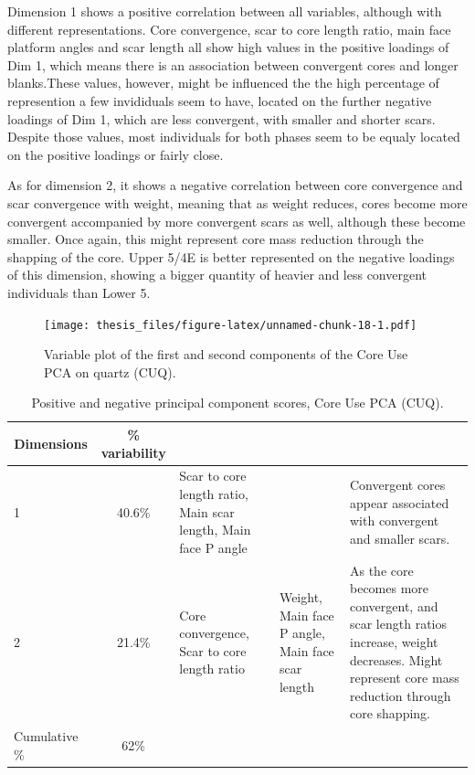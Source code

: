 \documentclass[12pt,twoside]{reedthesis}
\begin{document}
Dimension 1 shows a positive correlation between all variables, although with different representations. Core convergence, scar to core length ratio, main face platform angles and scar length all show high values in the positive loadings of Dim 1, which means there is an association between convergent cores and longer blanks.These values, however, might be influenced the the high percentage of represention a few invididuals seem to have, located on the further negative loadings of Dim 1, which are less convergent, with smaller and shorter scars. Despite those values, most individuals for both phases seem to be equaly located on the positive loadings or fairly close.

As for dimension 2, it shows a negative correlation between core convergence and scar convergence with weight, meaning that as weight reduces, cores become more convergent accompanied by more convergent scars as well, although these become smaller. Once again, this might represent core mass reduction through the shapping of the core. Upper 5/4E is better represented on the negative loadings of this dimension, showing a bigger quantity of heavier and less convergent individuals than Lower 5.
\begin{figure}
\centering
\texttt{[image: thesis\_files/figure-latex/unnamed-chunk-18-1.pdf]}
\caption{\label{fig:unnamed-chunk-18}Variable plot of the first and second components of the Core Use PCA on quartz (CUQ).}
\end{figure}
\begin{table}[!h]

\caption{\label{tab:unnamed-chunk-19}Positive and negative principal component scores, Core Use PCA (CUQ).}
\centering
\begin{tabular}[t]{lc>{\raggedright\arraybackslash}p{3cm}>{\raggedright\arraybackslash}p{3cm}>{\raggedright\arraybackslash}p{3cm}}
\toprule
\multicolumn{1}{c}{\textbf{Dimensions}} & \multicolumn{1}{c}{\textbf{\% variability}} & \multicolumn{1}{>{\centering\arraybackslash}p{3cm}}{\textbf{+}} & \multicolumn{1}{>{\centering\arraybackslash}p{3cm}}{\textbf{-}} & \multicolumn{1}{>{\centering\arraybackslash}p{3cm}}{\textbf{Interpretation}}\\
\midrule
1 & 40.6\% & Scar to core length ratio, Main scar length, Main face P angle &  & Convergent cores appear associated with convergent and smaller scars.\\
2 & 21.4\% & Core convergence, Scar to core length ratio & Weight, Main face P angle, Main face scar length & As the core becomes more convergent, and scar length ratios increase, weight decreases. Might represent core mass reduction through core shapping.\\
Cumulative \% & 62\% &  &  & \\
\bottomrule
\end{tabular}
\end{table}
\end{document}
